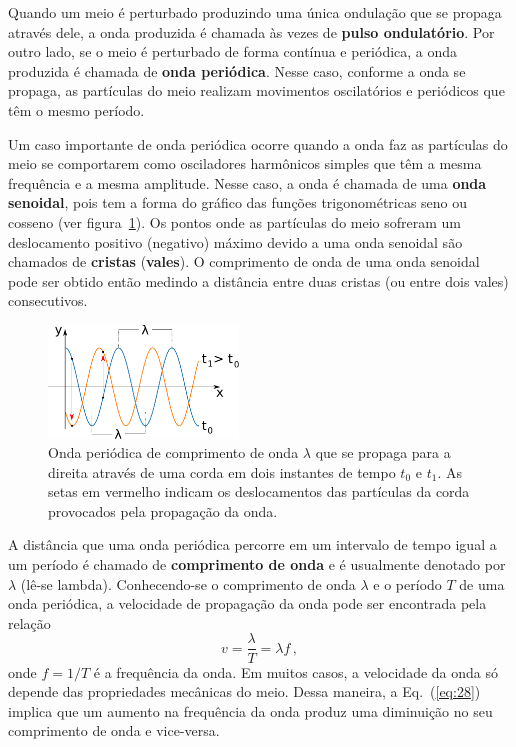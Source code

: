 \documentclass[twocolumn=on,fontsize=12pt,DIV=calc]{scrartcl}
\theoremstyle{definition}
\begin{document}
Quando um meio é perturbado produzindo uma única ondulação que se
propaga através dele, a onda produzida é chamada às vezes de
\textbf{pulso ondulatório}. Por outro lado, se o meio é perturbado de
forma contínua e periódica, a onda produzida é chamada de \textbf{onda
  periódica}. Nesse caso, conforme a onda se propaga, as partículas do
meio realizam movimentos oscilatórios e periódicos que têm o mesmo
período.

Um caso importante de onda periódica ocorre quando a onda faz as
partículas do meio se comportarem como osciladores harmônicos simples
que têm a mesma frequência e a mesma amplitude. Nesse caso, a onda é
chamada de uma \textbf{onda senoidal}, pois tem a forma do gráfico das
funções trigonométricas seno ou cosseno (ver
figura~\ref{fig:onda}). Os pontos onde as partículas do meio sofreram
um deslocamento positivo (negativo) máximo devido a uma onda senoidal
são chamados de \textbf{cristas} (\textbf{vales}). O comprimento de
onda de uma onda senoidal pode ser obtido então medindo a distância
entre duas cristas (ou entre dois vales) consecutivos.

\begin{figure}[ht]
  \centering
  \includegraphics[width=0.45\textwidth,keepaspectratio]{aux/onda.pdf}
  \caption{Onda periódica de comprimento de onda $\lambda$ que se
    propaga para a direita através de uma corda em dois instantes de
    tempo $t_0$ e $t_1$. As setas em vermelho indicam os deslocamentos
    das partículas da corda provocados pela propagação da onda.}
  \label{fig:onda}
\end{figure}

A distância que uma onda periódica percorre em um intervalo de tempo
igual a um período é chamado de \textbf{comprimento de onda} e é
usualmente denotado por $\lambda$ (lê-se lambda). Conhecendo-se o
comprimento de onda $\lambda$ e o período $T$ de uma onda periódica, a
velocidade de propagação da onda pode ser encontrada pela relação
\begin{equation}
  \label{eq:28}
  v=\frac{\lambda}{T}=\lambda f\,,
\end{equation}
onde $f=1/T$ é a frequência da onda. Em muitos casos, a velocidade da
onda só depende das propriedades mecânicas do meio. Dessa maneira, a
Eq.~(\ref{eq:28}) implica que um aumento na frequência da onda produz
uma diminuição no seu comprimento de onda e vice-versa.
\end{document}

